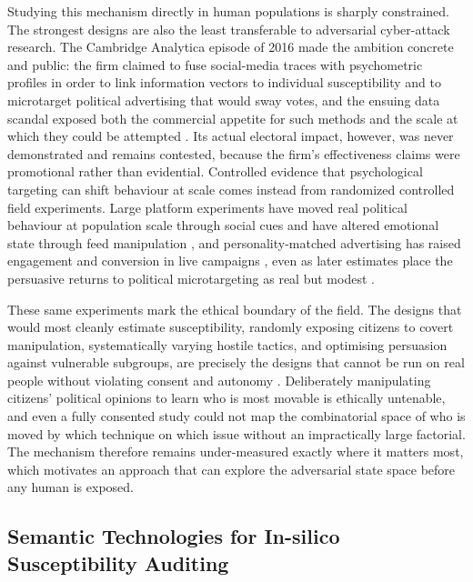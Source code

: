 \documentclass[11pt,a4paper]{article}
\begin{document}
Studying this mechanism directly in human populations is sharply constrained. The strongest
designs are also the least transferable to adversarial cyber-attack research. The Cambridge
Analytica episode of 2016 made the ambition concrete and public: the firm claimed to fuse
social-media traces with psychometric profiles in order to link information vectors to
individual susceptibility and to microtarget political advertising that would sway votes,
and the ensuing data scandal exposed both the commercial appetite for such methods and the
scale at which they could be attempted \citep{susser2019technology,isaak2018user}. Its
actual electoral impact, however, was never demonstrated and remains contested, because the
firm's effectiveness claims were promotional rather than evidential. Controlled evidence that
psychological targeting can shift behaviour at scale comes instead from randomized controlled
field experiments. Large platform experiments have moved real political behaviour at
population scale through social cues \citep{bond2012experiment} and have altered emotional
state through feed manipulation \citep{kramer2014experimental}, and personality-matched
advertising has raised engagement and conversion in live campaigns
\citep{matz2017psychological}, even as later estimates place the persuasive returns to
political microtargeting as real but modest \citep{tappin2023quantifying}.

These same experiments mark the ethical boundary of the field. The designs that would most
cleanly estimate susceptibility, randomly exposing citizens to covert manipulation,
systematically varying hostile tactics, and optimising persuasion against vulnerable
subgroups, are precisely the designs that cannot be run on real people without violating
consent and autonomy \citep{kramer2014experimental,susser2019technology}. Deliberately
manipulating citizens' political opinions to learn who is most movable is ethically
untenable, and even a fully consented study could not map the combinatorial space of who is
moved by which technique on which issue without an impractically large factorial. The
mechanism therefore remains under-measured exactly where it matters most, which motivates an
approach that can explore the adversarial state space before any human is exposed.

\subsection{Semantic Technologies for In-silico Susceptibility Auditing}
\end{document}
